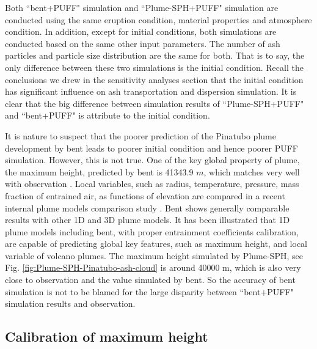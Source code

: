 Both ``bent+PUFF" simulation and ``Plume-SPH+PUFF" simulation are conducted using the same eruption condition, material properties and atmosphere condition. In addition, except for initial conditions, both simulations are conducted based on the same other input parameters. The number of ash particles and particle size distribution are the same for both. That is to say, the only difference between these two simulations is the initial condition. Recall the conclusions we drew in the sensitivity analyses section that the initial condition has significant influence on ash transportation and dispersion simulation. It is clear that the big difference between simulation results of ``Plume-SPH+PUFF" and ``bent+PUFF" is attribute to the initial condition.

It is nature to suspect that the poorer prediction of the Pinatubo plume development by bent leads to poorer initial condition and hence poorer PUFF simulation. However, this is not true. One of the key global property of plume, the maximum height, predicted by bent is 41343.9 $m$, which matches very well with observation \citep{lynch1996mount}. Local variables, such as radius, temperature, pressure, mass fraction of entrained air, as functions of elevation are compared in a recent internal plume models comparison study \citep{costa2016results}. Bent shows generally comparable results with other 1D and 3D plume models. It has been illustrated that 1D plume models including bent, with proper entrainment coefficients calibration, are capable of predicting global key features, such as maximum height, and local variable of volcano plumes. The maximum height simulated by Plume-SPH, see Fig. \ref{fig:Plume-SPH-Pinatubo-ash-cloud} is around 40000 m, which is also very close to observation and the value simulated by bent. So the accuracy of bent simulation is not to be blamed for the large disparity between ``bent+PUFF" simulation results and observation.

\subsection{Calibration of maximum height}

